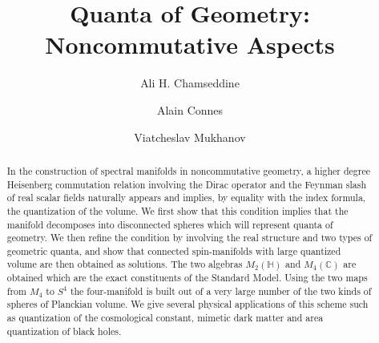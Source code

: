 \documentclass
[twocolumn,prl,unsortedaddress,superscriptaddress,showpacs]{revtex4}%
\begin{document}
\title{Quanta of Geometry: Noncommutative Aspects}
\author{Ali H. Chamseddine}
\author{Alain Connes}
\author{Viatcheslav Mukhanov}

\begin{abstract}
In the construction of spectral manifolds in noncommutative geometry, a higher
degree Heisenberg commutation relation involving the Dirac operator and the
Feynman slash of real scalar fields naturally appears and implies, by equality
with the index formula, the quantization of the volume. We first show that
this condition implies that the manifold decomposes into disconnected spheres
which will represent quanta of geometry. We then refine the condition by
involving the real structure and two types of geometric quanta, and show that
connected spin-manifolds with large quantized volume are then obtained as
solutions. The two algebras $M_{2}\left(  \mathbb{H}\right)  $ and
$M_{4}\left(  \mathbb{C}\right)  $ are obtained which are the exact
constituents of the Standard Model. Using the two maps from $M_{4}$ to $S^{4}$
the four-manifold is built out of a very large number of the two kinds of
spheres of Planckian volume. We give several physical applications of this
scheme such as quantization of the cosmological constant, mimetic dark matter
and area quantization of black holes.

\end{abstract}

\maketitle


\end{document}
